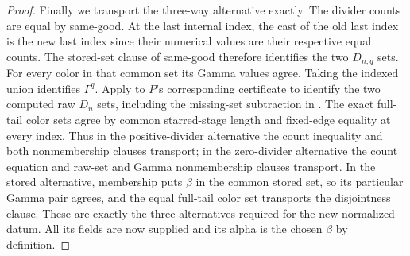 \begin{proof}
Finally we transport the three-way alternative exactly. The divider counts
are equal by same-good. At the last internal index, the cast of the old
last index is the new last index since their numerical values are their
respective equal counts. The stored-set clause of same-good therefore
identifies the two $D_{n,q}$ sets. For every color in that common set its
Gamma values agree. Taking the indexed union identifies $\Gamma^q$.
Apply  to $P$'s corresponding
certificate to identify the two computed raw $D_n$ sets, including the
missing-set subtraction in . The exact
full-tail color sets agree by common starred-stage length and fixed-edge
equality at every index. Thus in the positive-divider alternative the
count inequality and both nonmembership clauses transport; in the
zero-divider alternative the count equation and raw-set and Gamma
nonmembership clauses transport. In the stored alternative, membership
puts $\beta$ in the common stored set, so its particular Gamma pair
agrees, and the equal full-tail color set transports the disjointness
clause. These are exactly the three alternatives required for the new
normalized datum. All its fields are now supplied and its alpha is the
chosen $\beta$ by definition.
\end{proof}
